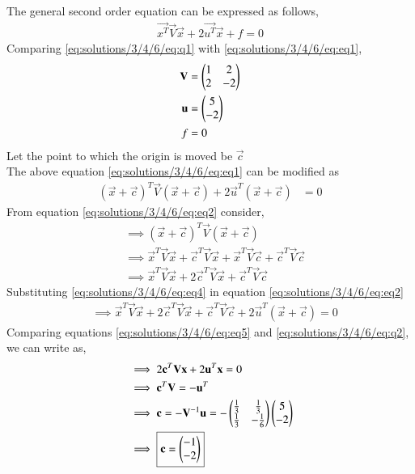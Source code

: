 The general second order equation can be expressed as follows,
\begin{align}
\vec{x^T}\vec{V}\vec{x}+2\vec{u^T}\vec{x}+f=0\label{eq:solutions/3/4/6/eq:eq1}
\end{align}
Comparing \eqref{eq:solutions/3/4/6/eq:q1} with \eqref{eq:solutions/3/4/6/eq:eq1},
\begin{align}
\mathbf{V} &= \begin{pmatrix}1 & 2\\2 & -2\end{pmatrix}\\
\mathbf{u} &= \begin{pmatrix}5\\ -2\end{pmatrix}\\
f &= 0
\end{align}
Let the point to which the origin is moved be $\vec{c}$\\
The above equation \eqref{eq:solutions/3/4/6/eq:eq1} can be modified as
\begin{align}
(\vec{x}+\vec{c})^T\vec{V}(\vec{x}+\vec{c})+2\vec{u}^T(\vec{x}+\vec{c})&=0\label{eq:solutions/3/4/6/eq:eq2}
\end{align}
From equation \eqref{eq:solutions/3/4/6/eq:eq2} consider,
\begin{align}
    &\implies(\vec{x}+\vec{c})^T\vec{V}(\vec{x}+\vec{c})\\
    &\implies\vec{x}^T\vec{V}\vec{x}+\vec{c}^T\vec{V}\vec{x}+\vec{x}^T\vec{V}\vec{c}+\vec{c}^T\vec{V}\vec{c}\label{eq:solutions/3/4/6/eq:eq3}\\
    &\implies\vec{x}^T\vec{V}\vec{x}+2\vec{c}^T\vec{V}\vec{x}+\vec{c}^T\vec{V}\vec{c}\label{eq:solutions/3/4/6/eq:eq4}
\end{align}
Substituting \eqref{eq:solutions/3/4/6/eq:eq4} in equation \eqref{eq:solutions/3/4/6/eq:eq2}
\begin{align}
    &\implies\vec{x}^T\vec{V}\vec{x}+2\vec{c}^T\vec{V}\vec{x}+\vec{c}^T\vec{V}\vec{c}+2\vec{u}^T(\vec{x}+\vec{c})=0 \label{eq:solutions/3/4/6/eq:eq5}
\end{align}
Comparing equations \eqref{eq:solutions/3/4/6/eq:eq5} and \eqref{eq:solutions/3/4/6/eq:q2}, we can write as,
\begin{align}
    &\implies 2\mathbf{c}^T\mathbf{V}\mathbf{x}+2\mathbf{u}^T\mathbf{x}=0\\
    &\implies \mathbf{c}^T\mathbf{V}= -\mathbf{u}^T\\
    &\implies \mathbf{c}= -\mathbf{V}^{-1}\mathbf{u}= -\begin{pmatrix}\frac{1}{3}&\frac{1}{3}\\ \frac{1}{3}&-\frac{1}{6}\end{pmatrix}\begin{pmatrix}5\\-2\end{pmatrix} \label{eq:solutions/3/4/6/eq:eq6}\\
    &\implies \boxed{\mathbf{c}= \begin{pmatrix}-1\\-2\end{pmatrix}} \label{eq:solutions/3/4/6/eq:eq7}
\end{align}
